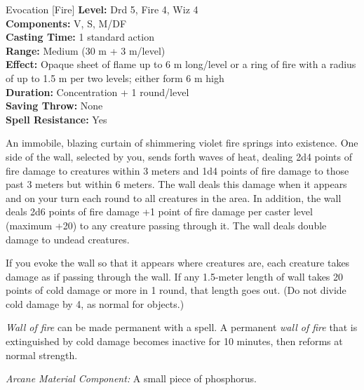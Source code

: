 {Evocation [Fire]}
{
	\textbf{Level:}
	Drd 5, Fire 4, Wiz 4\\
	\textbf{Components:}
	V, S, M/DF\\
	\textbf{Casting Time:}
	1 standard action\\
	\textbf{Range:}
	Medium (30 m + 3 m/level)\\
	\textbf{Effect:}
	Opaque sheet of flame up to 6 m long/level or a ring of fire with a radius of up to 1.5 m per two levels; either form 6 m high\\
	\textbf{Duration:}
	Concentration + 1 round/level\\
	\textbf{Saving Throw:}
	None\\
	\textbf{Spell Resistance:}
	Yes\\
}
{
	An immobile, blazing curtain of shimmering violet fire springs into existence. One side of the wall, selected by you, sends forth waves of heat, dealing 2d4 points of fire damage to creatures within 3 meters and 1d4 points of fire damage to those past 3 meters but within 6 meters. The wall deals this damage when it appears and on your turn each round to all creatures in the area. In addition, the wall deals 2d6 points of fire damage +1 point of fire damage per caster level (maximum +20) to any creature passing through it. The wall deals double damage to undead creatures.

	If you evoke the wall so that it appears where creatures are, each creature takes damage as if passing through the wall. If any 1.5-meter length of wall takes 20 points of cold damage or more in 1 round, that length goes out. (Do not divide cold damage by 4, as normal for objects.)

	\emph{Wall of fire} can be made permanent with a  spell. A permanent \emph{wall of fire} that is extinguished by cold damage becomes inactive for 10 minutes, then reforms at normal strength.

	\textit{Arcane Material Component:}
	A small piece of phosphorus.

}
